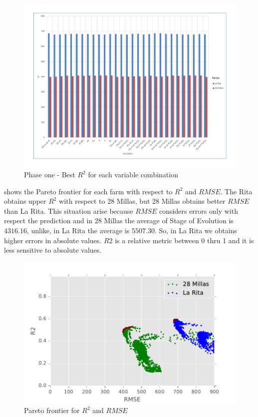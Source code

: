 \begin{figure}[H] 
 \centering
 \includegraphics[scale=.5]{2017-01-15-Variables-R2}
 \caption{Phase one - Best $R^2$ for each variable combination} 
 \label{figura7} 
\end{figure}

 shows the Pareto frontier for each farm with respect to $R^2$ and $RMSE$. The Rita obtains upper $R^2$ with respect to 28 Millas, but 28 Millas obtains better $RMSE$ than La Rita. This situation arise because $RMSE$ considers errors only with respect the prediction and in 28 Millas the average of Stage of Evolution is $4316.16$, unlike, in La Rita the average is $5507.30$. So, in La Rita we obtains higher errors in absolute values. $R2$ is a relative metric between 0 thru 1 and it is less sensitive to absolute values.

\begin{figure}[H] 
 \centering
 \includegraphics[scale=.8]{Usado_2017-04-30_Sigatoka_R2_RMSE}
 \caption{Pareto frontier for $R^2$ and $RMSE$} 
 \label{figura8} 
\end{figure}

